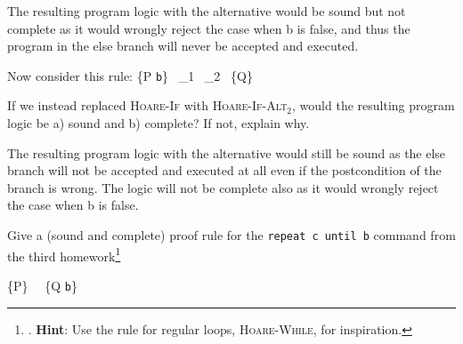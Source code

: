 \documentclass[12pt]{article}
\newenvironment{problem}[2][Problem]{\begin{trivlist}
\item[\hskip \labelsep {\bfseries #1}\hskip \labelsep {\bfseries #2.}]}{\end{trivlist}}
\begin{document}
  The resulting program logic with the alternative would be sound but not complete as it would wrongly reject the case when b is false, and thus the program in the else branch will never be accepted and executed.

  \begin{problem}{3 (1 point)}
    Now consider this rule:
  {\vdash \{P \land \lstinline|b|\}~ _1~ _2  ~\{Q\}}

  If we instead replaced \textsc{Hoare-If} with \textsc{Hoare-If-Alt$_2$},
  would the resulting program logic be a) sound and b) complete?
  If not, explain why.
  \end{problem}

  The resulting program logic with the alternative would still be sound as the else branch will not be accepted and executed at all even if the postcondition of the branch is wrong. The logic will not be complete also as it would wrongly reject the case when b is false.

\pagebreak

  \begin{problem}{4 (3 points)}
    Give a (sound and complete) proof rule for the
    \lstinline|repeat c until b| command from the third
    homework\footnote{. \textbf{Hint}: Use the rule for regular loops,
      \textsc{Hoare-While}, for inspiration.}
  \end{problem}
  
  {\vdash \{P\}~ ~\{Q \land \lstinline|b|\}}
\end{document}
